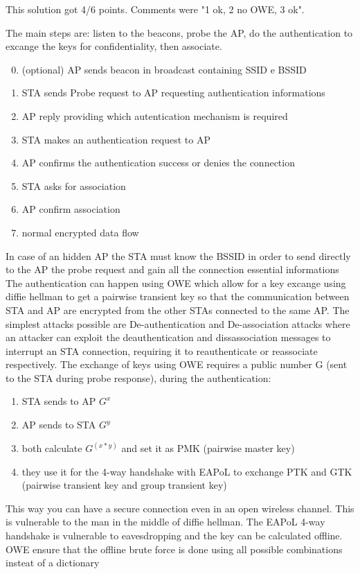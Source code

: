 \begin{solution}
    This solution got 4/6 points. Comments were "1 ok, 2 no OWE, 3 ok".

    The main steps are: listen to the beacons, probe the AP, do the authentication to excange the keys for confidentiality, then associate.
    \begin{enumerate} \setcounter{enumi}{-1} 
        \item (optional) AP sends beacon in broadcast containing SSID e BSSID
        \item STA sends Probe request to AP requesting authentication informations
        \item AP reply providing which autentication mechanism is required
        \item STA makes an authentication request to AP
        \item AP confirms the authentication success or denies the connection
        \item STA asks for association
        \item AP confirm association
        \item normal encrypted data flow
    \end{enumerate}
    
    
    In case of an hidden AP the STA must know the BSSID in order to send directly to the AP the probe request and gain all the connection essential informations
    The authentication can happen using OWE which allow for a key excange using diffie hellman to get a pairwise transient key so that the communication between STA and AP are encrypted from the other STAs connected to the same AP.
    The simplest attacks possible are De-authentication and De-association attacks where an attacker can exploit the deauthentication and dissassociation messages to interrupt an STA connection, requiring it to reauthenticate or reassociate respectively.
    The exchange of keys using OWE requires a public number G (sent to the STA during probe response), during the authentication:
    
    \begin{enumerate}
        \item STA sends to AP $G^x$
        \item AP sends to STA $G^y$
        \item both calculate $G^(x*y)$ and set it as PMK (pairwise master key)
        \item they use it for the 4-way handshake with EAPoL to exchange PTK and GTK (pairwise transient key and group transient key)
    \end{enumerate}

    This way you can have a secure connection even in an open wireless channel. This is vulnerable to the man in the middle of diffie hellman.
    The EAPoL 4-way handshake is vulnerable to eavesdropping and the key can be calculated offline. OWE ensure that the offline brute force is done using all possible combinations insteat of a dictionary
\end{solution}

